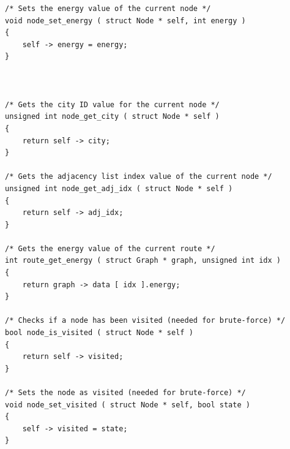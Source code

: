 \documentclass[11pt]{article}
\begin{document}
\begin{verbatim}
/* Sets the energy value of the current node */
void node_set_energy ( struct Node * self, int energy )
{
    self -> energy = energy;
}



/* Gets the city ID value for the current node */
unsigned int node_get_city ( struct Node * self )
{
    return self -> city;
}

/* Gets the adjacency list index value of the current node */
unsigned int node_get_adj_idx ( struct Node * self )
{
    return self -> adj_idx;
}

/* Gets the energy value of the current route */
int route_get_energy ( struct Graph * graph, unsigned int idx )
{
    return graph -> data [ idx ].energy;
}

/* Checks if a node has been visited (needed for brute-force) */
bool node_is_visited ( struct Node * self )
{
    return self -> visited;
}

/* Sets the node as visited (needed for brute-force) */
void node_set_visited ( struct Node * self, bool state )
{
    self -> visited = state;
}
\end{verbatim}
\newpage
\end{document}
